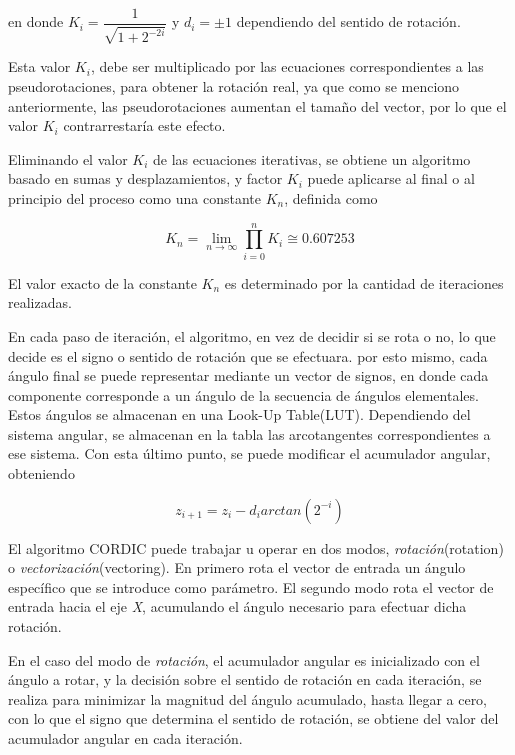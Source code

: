 en donde $K_{i}=\dfrac{1}{\sqrt{1+2^{-2i}}}$ y $d_{i} = \pm 1 $ dependiendo del sentido de rotación.

Esta valor $K_{i}$, debe ser multiplicado por las ecuaciones correspondientes a las pseudorotaciones, para obtener la rotación real, ya que como se menciono anteriormente, las pseudorotaciones aumentan el tamaño del vector, por lo que el valor $K_{i}$ contrarrestaría este efecto.

Eliminando el valor $K_{i}$ de las ecuaciones iterativas, se obtiene un algoritmo basado en sumas y desplazamientos, y factor $K_{i}$ puede aplicarse al final o al principio del proceso como una constante $K_{n}$, definida como

\begin{equation}\label{eq:Kn}
K_{n}=\lim_{n  \rightarrow \infty}\prod_{i=0}^{n}K_{i}\cong 0.607253
\end{equation}
 
El valor exacto de la constante $K_{n}$ es determinado por la cantidad de iteraciones realizadas.

En cada paso de iteración, el algoritmo, en vez de decidir si se rota o no, lo que decide es el signo o sentido de rotación que se efectuara. por esto mismo, cada ángulo final se puede representar mediante un vector de signos, en donde cada componente corresponde a un ángulo de la secuencia de ángulos elementales. Estos ángulos se almacenan en una Look-Up Table(LUT). Dependiendo del sistema angular, se almacenan en la tabla las arcotangentes correspondientes a ese sistema.  Con esta último punto, se puede modificar el acumulador angular, obteniendo

\begin{equation}\label{eq:acum_fin}
z_{i+1}=z_{i}-d_{i}arctan(2^{-i})
\end{equation}

El algoritmo CORDIC puede trabajar u operar en dos modos, \textit{rotación}(rotation) o \textit{vectorización}(vectoring). En primero rota el vector de entrada un ángulo específico que se introduce como parámetro. El segundo modo rota el vector de entrada hacia el eje \textit{X}, acumulando el ángulo necesario para efectuar dicha rotación.

En el caso del modo de \textit{rotación}, el acumulador angular es inicializado con el ángulo a rotar, y la decisión sobre el sentido de rotación en cada iteración, se realiza para minimizar la magnitud del ángulo acumulado, hasta llegar a cero, con lo que el signo que determina el sentido de rotación, se obtiene del valor del acumulador angular en cada iteración.


